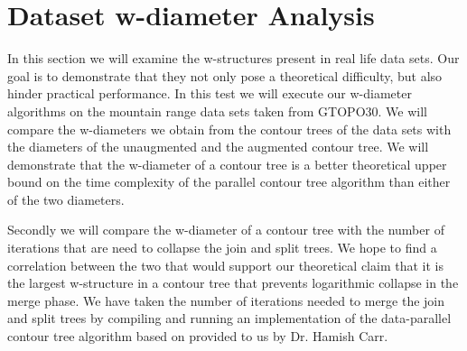 
%
%


\section {Dataset w-diameter Analysis}

In this section we will examine the w-structures present in real life data sets. Our goal is to demonstrate that they not only pose a theoretical difficulty, but also hinder practical performance. In this test we will execute our w-diameter algorithms on the mountain range data sets taken from GTOPO30. We will compare the w-diameters we obtain from the contour trees of the data sets with the diameters of the unaugmented and the augmented contour tree. We will demonstrate that the w-diameter of a contour tree is a better theoretical upper bound on the time complexity of the parallel contour tree algorithm than either of the two diameters.

Secondly we will compare the w-diameter of a contour tree with the number of iterations that are need to collapse the join and split trees. We hope to find a correlation between the two that would support our theoretical claim that it is the largest w-structure in a contour tree that prevents logarithmic collapse in the merge phase. We have taken the number of iterations needed to merge the join and split trees by compiling and running an implementation of the data-parallel contour tree algorithm based on \cite{parallel-peak-pruning} provided to us by Dr. Hamish Carr.

